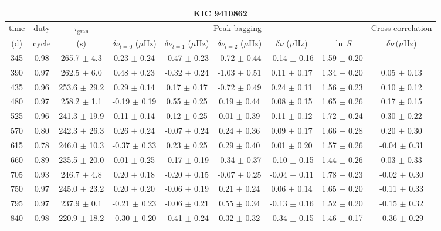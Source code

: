 \documentclass[twocolumn]{aastex61}%
\begin{document}
\begin{table*}[ht]\centering\fontsize{9.}{7.}\selectfont
\begin{tabular}{ccc|ccccc|c}
\multicolumn{9}{c}{KIC 9410862}\\ \hline\hline
time & duty & $\tau_\text{gran}$ &\multicolumn{5}{c|}{Peak-bagging}&Cross-correlation\\
(d)& cycle & (s)&$\delta\nu_{l=0}$ ($\mu$Hz) & $\delta\nu_{l=1}$ ($\mu$Hz) & $\delta\nu_{l=2}$ ($\mu$Hz) & $\delta\nu$ ($\mu$Hz)& $\ln\,S$ & $\delta\nu\,(\mu$Hz)\\\hline
345 & 0.98 & 265.7 $\pm$ 4.3 & 0.23 $\pm$ 0.24 & -0.47 $\pm$ 0.23 & -0.72 $\pm$ 0.44 & -0.14 $\pm$ 0.16 & 1.59 $\pm$ 0.20 & --\\
390 & 0.97 & 262.5 $\pm$ 6.0 & 0.48 $\pm$ 0.23 & -0.32 $\pm$ 0.24 & -1.03 $\pm$ 0.51 & 0.11 $\pm$ 0.17 & 1.34 $\pm$ 0.20 & 0.05 $\pm$ 0.13\\
435 & 0.96 & 253.6 $\pm$ 29.2 & 0.29 $\pm$ 0.14 & 0.17 $\pm$ 0.17 & -0.72 $\pm$ 0.49 & 0.24 $\pm$ 0.11 & 1.56 $\pm$ 0.23 & 0.10 $\pm$ 0.12\\
480 & 0.97 & 258.2 $\pm$ 1.1 & -0.19 $\pm$ 0.19 & 0.55 $\pm$ 0.25 & 0.19 $\pm$ 0.44 & 0.08 $\pm$ 0.15 & 1.65 $\pm$ 0.26 & 0.17 $\pm$ 0.15\\
525 & 0.96 & 241.3 $\pm$ 19.9 & 0.11 $\pm$ 0.14 & 0.12 $\pm$ 0.25 & 0.01 $\pm$ 0.39 & 0.11 $\pm$ 0.12 & 1.72 $\pm$ 0.24 & 0.30 $\pm$ 0.22\\
570 & 0.80 & 242.3 $\pm$ 26.3 & 0.26 $\pm$ 0.24 & -0.07 $\pm$ 0.24 & 0.24 $\pm$ 0.36 & 0.09 $\pm$ 0.17 & 1.66 $\pm$ 0.28 & 0.20 $\pm$ 0.30\\
615 & 0.78 & 246.0 $\pm$ 10.3 & -0.37 $\pm$ 0.33 & 0.23 $\pm$ 0.25 & 0.29 $\pm$ 0.40 & 0.01 $\pm$ 0.20 & 1.57 $\pm$ 0.26 & -0.04 $\pm$ 0.31\\
660 & 0.89 & 235.5 $\pm$ 20.0 & 0.01 $\pm$ 0.25 & -0.17 $\pm$ 0.19 & -0.34 $\pm$ 0.37 & -0.10 $\pm$ 0.15 & 1.44 $\pm$ 0.26 & 0.03 $\pm$ 0.33\\
705 & 0.93 & 246.7 $\pm$ 4.8 & 0.20 $\pm$ 0.18 & -0.20 $\pm$ 0.15 & -0.07 $\pm$ 0.25 & -0.04 $\pm$ 0.11 & 1.78 $\pm$ 0.23 & -0.02 $\pm$ 0.30\\
750 & 0.97 & 245.0 $\pm$ 23.2 & 0.20 $\pm$ 0.20 & -0.06 $\pm$ 0.19 & 0.21 $\pm$ 0.24 & 0.06 $\pm$ 0.14 & 1.65 $\pm$ 0.20 & -0.11 $\pm$ 0.33\\
795 & 0.97 & 237.9 $\pm$ 0.1 & -0.21 $\pm$ 0.23 & -0.06 $\pm$ 0.21 & 0.55 $\pm$ 0.34 & -0.13 $\pm$ 0.16 & 1.52 $\pm$ 0.20 & -0.15 $\pm$ 0.32\\
840 & 0.98 & 220.9 $\pm$ 18.2 & -0.30 $\pm$ 0.20 & -0.41 $\pm$ 0.24 & 0.32 $\pm$ 0.32 & -0.34 $\pm$ 0.15 & 1.46 $\pm$ 0.17 & -0.36 $\pm$ 0.29\\

\end{tabular}
\end{table*}
\end{document}
